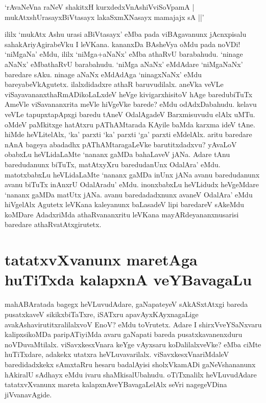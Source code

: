 \begin{shloka}
`rAvaNeVna raNeV shakitxH kurxdedxVnAshiVviSoVpamA |\\
mukAtx\s \s  shUrasayxBiVtasayx lakaSxmXNasayx mamajajx sA ||'
\end{shloka}
ililx `mukAtx Ashu urasi aBiVtasayx' eMba pada viBAgavanunx jAcnxpisalu sahakAriyAgirabeVku I leVKana. kananxDa BAsheVya oMdu pada noVDi! `niMgaNa' eMdu, ililx  `niMga+aNaNx' eMba athaRvU barabahudu. `ninage aNaNx' eMbathaRvU‌ barabahudu. `niMga aNaNx' eMdAdare `niMgaNaNx' baredare sAku. ninage aNaNx eMdAdAga `ninagxNaNx' eMdu bareyabeVkAgutetx. ilalxdidadxre athaR baruvudilalx. aneVka veVLe viSayavananxthaRmADikoLaLxdeV heVge kivigarxhisitoV hAge baredubiTuTx AmeVle viSavananxrita meVle hiVgeVke barede? eMdu odAdxDabahudu. kelavu veVLe tapupxtapApxgi baredu tAneV OdalAgadeV Barxmisuvudu elAlx uMTu. oMdeV paMkitxge hatAtxru pAThAMtarada KAyile baMda karxma ideV tAne. hiMde heVLitelAlx, `ka' parxti `ka' parxti `ga' parxti eMdelAlx. aritu baredare nAnA bageya abadadhx pAThAMtaragaLeVke barutitxdadxvu? yAvaLoV obabxLu heVLidaLaMte `nananx gaMDa bahaLaveV jANa. Adare tAnu baredudanunx biTuTx, matAtxyXru baredudanUnx OdalAra' eMdu. matotxbabxLu heVLidaLaMte `nananx gaMDa inUnx jANa avanu baredudanunx avanu biTuTx inAnxrU OdalAradu' eMdu. inonxbabxLu heVLidudx heVgeMdare `nananx gaMDa matUtx jANa. avanu baredadadxnunx avaneV OdalAra' eMdu hiVgelAlx Agutetx leVKana kaleyanunx baLasadeV lipi baredareV sAkeMdu koMDare AdadxriMda athaRvananxritu leVKana mayARdeyananxnusarisi baredare athaRvatAtxgirutetx.

\section*{tatatxvXvanunx maretAga huTiTxda kalapxnA veYBavagaLu}

mahABAratada bagegx heVLuvudAdare, gaNapateyeV sAkASxtAtxgi bareda pusatxkaveV sikikxbiTaTxre, iSATxru apavAyxKAyxnagaLige avakAshavirutitxralilalxvoV EnoV? eMdu toVrutetx. Adare I shirxVveYSaNxvaru kalipxsikoMDa paripATiyiMda avaru gaNapati bareda pusatxkavanenxduru noVDuvaMtilalx. viSavxkesxVnara keYge vAyxsaru koDalilalxveVke? eMba ciMte huTiTxdare, adakekx utatxra heVLuvavarilalx. viSavxkesxVnariMdaleV baredidadxkekx sAmxtaRru hesaru badalAyisi sholxVkamADi gaNeVshananunx hAkiralU sAdhayx eMdu ivaru shaMkisalUbahudu. oTiTxnalilx heVLuvudAdare tatatxvXvanunx mareta kalapxnAveYBavagaLelAlx seVri nagegeVDina jiVvanavAgide.

